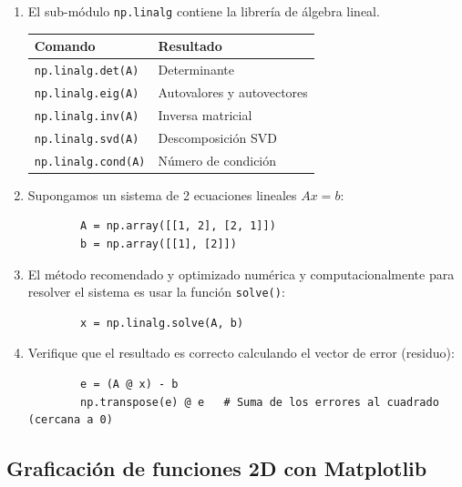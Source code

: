 \begin{enumerate}
	\item El sub-módulo \texttt{np.linalg} contiene la librería de álgebra lineal. 
	\begin{center}
		\begin{tabular}{ll}
			\textbf{Comando} & \textbf{Resultado} \\ \hline
			\texttt{np.linalg.det(A)} & Determinante \\
			\texttt{np.linalg.eig(A)} & Autovalores y autovectores \\
			\texttt{np.linalg.inv(A)} & Inversa matricial \\
			\texttt{np.linalg.svd(A)} & Descomposición SVD \\
			\texttt{np.linalg.cond(A)} & Número de condición \\
		\end{tabular}
	\end{center}
	
	\item Supongamos un sistema de 2 ecuaciones lineales $Ax=b$:
	\begin{verbatim}
		A = np.array([[1, 2], [2, 1]])
		b = np.array([[1], [2]])
	\end{verbatim}
	
	\item El método recomendado y optimizado numérica y computacionalmente para resolver el sistema es usar la función \texttt{solve()}:
	\begin{verbatim}
		x = np.linalg.solve(A, b)
	\end{verbatim}
	
	\item Verifique que el resultado es correcto calculando el vector de error (residuo):
	\begin{verbatim}
		e = (A @ x) - b
		np.transpose(e) @ e   # Suma de los errores al cuadrado (cercana a 0)
	\end{verbatim}
\end{enumerate}

\subsection{Graficación de funciones 2D con Matplotlib}

